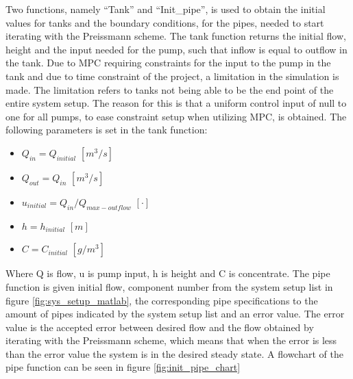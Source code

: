 Two functions, namely ``Tank'' and ``Init\_pipe'', is used to obtain the initial values for tanks and the boundary conditions, for the pipes, needed to start iterating with the Preissmann scheme. The tank function returns the initial flow, height and the input needed for the pump, such that inflow is equal to outflow in the tank. Due to MPC requiring constraints for the input to the pump in the tank and due to time constraint of the project, a limitation in the simulation is made. The limitation refers to tanks not being able to be the end point of the entire system setup. The reason for this is that a  uniform control input of null to one for all pumps, to ease constraint setup when utilizing MPC, is obtained. The following parameters is set in the tank function:
\begin{itemize}
	\item $Q_{in} = Q_{initial}$ $[m^3/s]$
	\item $Q_{out} = Q_{in}$ $[m^3/s]$
	\item $u_{initial} = Q_{in}/Q_{max-outflow}$ $[\cdot]$
	\item $h = h_{initial}$ $[m]$
	\item $C = C_{initial}$ $[g/m^3]$
\end{itemize}

Where Q is flow, u is pump input, h is height and C is concentrate.
The pipe function is given initial flow, component number from the system setup list in figure \ref{fig:sys_setup_matlab}, the corresponding pipe specifications to the amount of pipes indicated by the system setup list and an error value. The error value is the accepted error between desired flow and the flow obtained by iterating with the Preissmann scheme, which means that when the error is less than the error value the system is in the desired steady state. A flowchart of the pipe function can be seen in figure \ref{fig:init_pipe_chart} 

